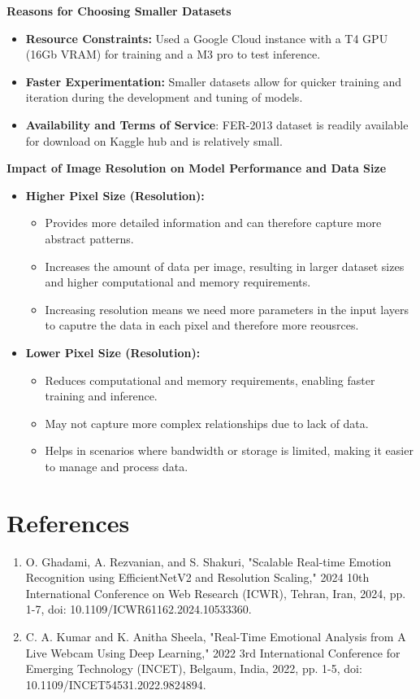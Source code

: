 \documentclass{article}
\begin{document}
\textbf{Reasons for Choosing Smaller Datasets}

\begin{itemize}
    \item \textbf{Resource Constraints:} Used a Google Cloud instance with a T4 GPU (16Gb VRAM) for training and a M3 pro to test inference. 
    \item \textbf{Faster Experimentation:} Smaller datasets allow for quicker training and iteration during the development and tuning of models.
    \item \textbf{Availability and Terms of Service}: FER-2013 dataset is readily available for download on Kaggle hub and is relatively small.
\end{itemize}

\textbf{Impact of Image Resolution on Model Performance and Data Size}

\begin{itemize}
    \item \textbf{Higher Pixel Size (Resolution):}
    \begin{itemize}
        \item Provides more detailed information and can therefore capture more abstract patterns.
        \item Increases the amount of data per image, resulting in larger dataset sizes and higher computational and memory requirements.
        \item Increasing resolution means we need more parameters in the input layers to caputre the data in each pixel and therefore more reousrces.
    \end{itemize}
    \item \textbf{Lower Pixel Size (Resolution):}
    \begin{itemize}
        \item Reduces computational and memory requirements, enabling faster training and inference.
        \item May not capture more complex relationships due to lack of data.
        \item Helps in scenarios where bandwidth or storage is limited, making it easier to manage and process data.
    \end{itemize}
\end{itemize}

\section*{References}
\begin{enumerate}
    \item O. Ghadami, A. Rezvanian, and S. Shakuri, "Scalable Real-time Emotion Recognition using EfficientNetV2 and Resolution Scaling," 2024 10th International Conference on Web Research (ICWR), Tehran, Iran, 2024, pp. 1-7, doi: 10.1109/ICWR61162.2024.10533360.
    \item C. A. Kumar and K. Anitha Sheela, "Real-Time Emotional Analysis from A Live Webcam Using Deep Learning," 2022 3rd International Conference for Emerging Technology (INCET), Belgaum, India, 2022, pp. 1-5, doi: 10.1109/INCET54531.2022.9824894.
\end{enumerate}
\end{document}
